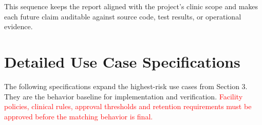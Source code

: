 \documentclass[a4paper,12pt]{article}
\newcommand{\weak}[1]{\textcolor{red}{#1}}
\begin{document}
This sequence keeps the report aligned with the project's clinic scope and makes each future claim auditable against source code, test results, or operational evidence.

\appendix

\section{Detailed Use Case Specifications}
The following specifications expand the highest-risk use cases from Section 3. They are the behavior baseline for implementation and verification. \weak{Facility policies, clinical rules, approval thresholds and retention requirements must be approved before the matching behavior is final.}
\end{document}
